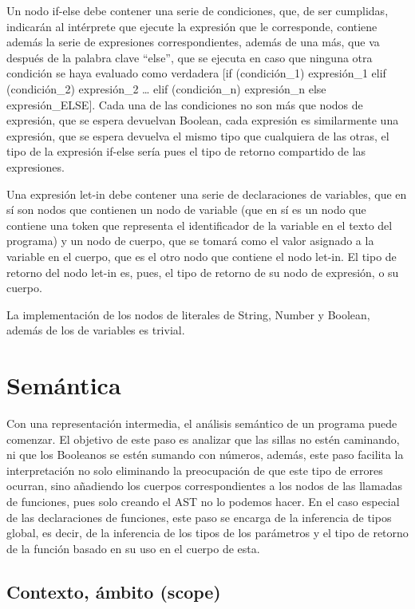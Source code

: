 \documentclass{article}
\begin{document}
Un nodo if-else debe contener una serie de condiciones, que, de ser cumplidas, indicarán al intérprete que ejecute la expresión que le corresponde, contiene además la serie de expresiones correspondientes, además de una más, que va después de la palabra clave “else”, que se ejecuta en caso que ninguna otra condición se haya evaluado como verdadera [if (condición\_1) expresión\_1 elif (condición\_2) expresión\_2 … elif (condición\_n) expresión\_n else expresión\_ELSE]. Cada una de las condiciones no son más que nodos de expresión, que se espera devuelvan Boolean, cada expresión es similarmente una expresión, que se espera devuelva el mismo tipo que cualquiera de las otras, el tipo de la expresión if-else sería pues el tipo de retorno compartido de las expresiones. 

Una expresión let-in debe contener una serie de declaraciones de variables, que en sí son nodos que contienen un nodo de variable (que en sí es un nodo que contiene una token que representa el identificador de la variable en el texto del programa) y un nodo de cuerpo, que se tomará como el valor asignado a la variable en el cuerpo, que es el otro nodo que contiene el nodo let-in. El tipo de retorno del nodo let-in es, pues, el tipo de retorno de su nodo de expresión, o su cuerpo.

La implementación de los nodos de literales de String, Number y Boolean, además de los de variables es trivial.

\newpage

\section{Semántica}

Con una representación intermedia, el análisis semántico de un programa puede comenzar. El objetivo de este paso es analizar que las sillas no estén caminando, ni que los Booleanos se estén sumando con números, además, este paso facilita la interpretación no solo eliminando la preocupación de que este tipo de errores ocurran, sino añadiendo los cuerpos correspondientes a los nodos de las llamadas de funciones, pues solo creando el AST no lo podemos hacer. En el caso especial de las declaraciones de funciones, este paso se encarga de la inferencia de tipos global, es decir, de la inferencia de los tipos de los parámetros y el tipo de retorno de la función basado en su uso en el cuerpo de esta.

\subsection{Contexto, ámbito (scope)}
\end{document}
